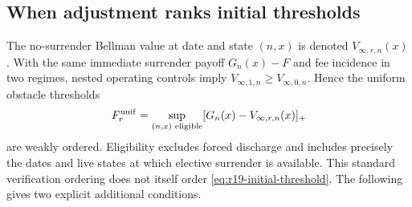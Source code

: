 \subsection{When adjustment ranks initial thresholds}
The no-surrender Bellman value at date and state $(n,x)$ is denoted $V_{\infty,r,n}(x)$. With the same immediate surrender payoff $G_n(x)-F$ and fee incidence in two regimes, nested operating controls imply $V_{\infty,1,n}\geq V_{\infty,0,n}$. Hence the uniform obstacle thresholds
\begin{equation}
 F^{\rm unif}_r=\sup_{(n,x)\text{ eligible}}[G_n(x)-V_{\infty,r,n}(x)]_+
 \label{eq:r19-uniform-threshold}
\end{equation}
are weakly ordered. Eligibility excludes forced discharge and includes precisely the dates and live states at which elective surrender is available. This standard verification ordering does not itself order \eqref{eq:r19-initial-threshold}. The following gives two explicit additional conditions.

